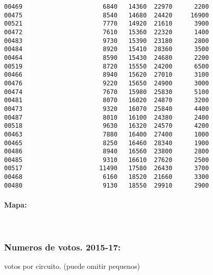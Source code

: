 \documentclass[11pt]{article}
\begin{document}
\begin{verbatim}
00469                      6840   14360  22970      2200
00475                      8540   14680  24420     16900
00521                      7770   14920  21610      3900
00472                      7610   15360  22320      1400
00483                      9730   15390  23180      2800
00484                      8920   15410  28360      3500
00464                      8590   15430  24680      2200
00519                      8720   15550  24200      6500
00466                      8940   15620  27010      3100
00476                      9220   15650  24900      3000
00474                      7670   15980  25830      5100
00481                      8070   16020  24870      3200
00473                      9320   16070  25840      4400
00487                      8010   16100  24380      2400
00518                      9630   16320  24570      4200
00463                      7880   16400  27400      1000
00465                      8250   16460  28340      1900
00486                      8940   16560  23800      2800
00485                      9310   16610  27620      2500
00517                     11490   17580  26430      3700
00468                      6160   18520  21660      3300
00480                      9130   18550  29910      2900
    \end{verbatim}

    
    \hypertarget{mapa}{%
\paragraph{Mapa:}\label{mapa}}

    
    \begin{center}
    \end{center}
    { \hspace*{\fill} \\}
    
    \hypertarget{numeros-de-votos.-2015-17}{%
\subsubsection{Numeros de votos.
2015-17:}\label{numeros-de-votos.-2015-17}}

    
    votos por circuito. (puede omitir pequenos)

    
    
\end{document}
